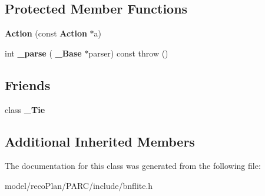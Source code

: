 \subsection*{Protected Member Functions}
\begin{DoxyCompactItemize}
\item 
\mbox{\label{classbnf_1_1_action_a2e13af9e01185e0443815825f463349f}} 
{\bfseries Action} (const \textbf{ Action} $\ast$a)
\item 
\mbox{\label{classbnf_1_1_action_a59f61814edc11a5b513fb4fc10158543}} 
int {\bfseries \+\_\+parse} (\textbf{ \+\_\+\+Base} $\ast$parser) const  throw ()
\end{DoxyCompactItemize}
\subsection*{Friends}
\begin{DoxyCompactItemize}
\item 
\mbox{\label{classbnf_1_1_action_ab555bd08f573aad86ad95feb76007c15}} 
class {\bfseries \+\_\+\+Tie}
\end{DoxyCompactItemize}
\subsection*{Additional Inherited Members}


The documentation for this class was generated from the following file\+:\begin{DoxyCompactItemize}
\item 
model/reco\+Plan/\+P\+A\+R\+C/include/bnflite.\+h\end{DoxyCompactItemize}
